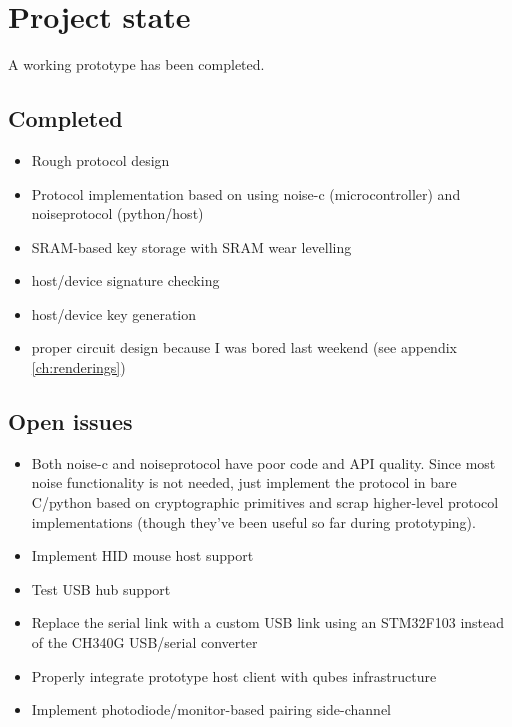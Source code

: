 \documentclass[12pt,a4paper,notitlepage]{article}
\begin{document}
\section{Project state}
A working prototype has been completed.

\subsection{Completed}
\begin{itemize}
    \item Rough protocol design
    \item Protocol implementation based on \textcite{perrin01} using noise-c (microcontroller) and noiseprotocol (python/host)
    \item SRAM-based key storage with SRAM wear levelling
    \item host/device signature checking
    \item host/device key generation
    \item proper circuit design because I was bored last weekend (see appendix \ref{ch:renderings})
\end{itemize}

\subsection{Open issues}
\begin{itemize}
    \item Both noise-c and noiseprotocol have poor code and API quality. Since most noise functionality is not needed,
        just implement the protocol in bare C/python based on cryptographic primitives and scrap higher-level protocol
        implementations (though they've been useful so far during prototyping).
    \item Implement HID mouse host support
    \item Test USB hub support
    \item Replace the serial link with a custom USB link using an STM32F103 instead of the CH340G USB/serial converter
    \item Properly integrate prototype host client with qubes infrastructure
    \item Implement photodiode/monitor-based pairing side-channel
\end{itemize}
\end{document}
